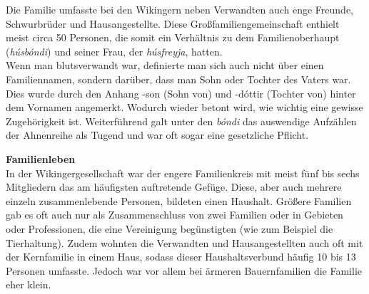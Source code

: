 \documentclass[12pt,a4paper,ngerman,openany]{book}
\begin{document}
Die Familie umfasste bei den Wikingern neben Verwandten auch enge Freunde,
Schwurbrüder und Hausangestellte. Diese Großfamiliengemeinschaft enthielt meist circa 50 Personen, die somit ein Verhältnis zu dem Familienoberhaupt (\textit{húsbóndi}) und seiner Frau, der \textit{húsfreyja}, hatten.\\
Wenn man blutsverwandt war, definierte man sich auch nicht über einen Familiennamen, sondern darüber, dass man Sohn oder Tochter des Vaters war. Dies wurde durch den Anhang -son (Sohn von) und -dóttir (Tochter von) hinter dem Vornamen angemerkt.
Wodurch wieder betont wird, wie wichtig eine gewisse \glqq Zugehörigkeit\grqq{} ist. Weiterführend galt unter den \textit{bóndi} das auswendige Aufzählen der Ahnenreihe als Tugend und war oft sogar eine gesetzliche Pflicht.

\textbf{Familienleben}\\
In der Wikingergesellschaft war der engere Familienkreis mit meist fünf bis sechs Mitgliedern das am häufigsten auftretende Gefüge. Diese, aber auch mehrere einzeln zusammenlebende Personen, bildeten einen Haushalt. Größere Familien gab es oft auch nur als Zusammenschluss von zwei Familien oder in Gebieten oder Professionen, die eine Vereinigung begünstigten (wie zum Beispiel die Tierhaltung). Zudem wohnten die Verwandten und Hausangestellten auch oft mit der Kernfamilie in einem Haus, sodass dieser Haushaltsverbund häufig 10 bis 13 Personen umfasste. Jedoch war vor allem bei ärmeren Bauernfamilien die Familie eher klein.
\end{document}
